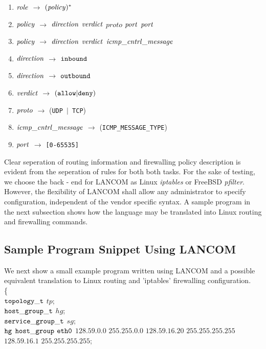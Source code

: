 \begin{enumerate}
\item \noindent ${\it role}$ $\rightarrow$ $({\it policy})^{*}$ \\
\item ${\it policy}$ $\rightarrow$ ${\it direction}$ ${\it verdict}$ ${proto}$ ${\it port}$ ${\it port}$ \\ 
\item ${\it policy}$ $\rightarrow$ ${\it direction}$ ${\it verdict}$ ${\it icmp\_cntrl\_message}$ \\ 
\item ${\it direction}$ $\rightarrow$ ${\tt inbound}$ \\ 
\item ${\it direction}$ $\rightarrow$ ${\tt outbound}$ \\ 
\item ${\it verdict}$ $\rightarrow$ $({\tt allow}|{\tt deny})$ \\ 
\item ${\it proto}$ $\rightarrow$ ({\tt UDP $ | $ TCP}) \\ 
\item ${\it icmp\_cntrl\_message}$ $\rightarrow$ ({\tt ICMP\_MESSAGE\_TYPE}) \\ 
\item ${\it port}$ $\rightarrow$ {\tt [0-65535]}\\
\end{enumerate}

  Clear seperation of routing information and firewalling policy description
  is evident from the seperation of rules for both both tasks.
   For the sake of testing, we choose the back - end for LANCOM as Linux
  {\it iptables} or FreeBSD {\it pfilter}. However, the flexibility of LANCOM 
   shall allow any administrator to specify configuration, independent of the 
   vendor specific syntax. A sample program in the next subsection shows how
  the language may be translated into Linux routing and firewalling commands.

 \subsection{Sample Program Snippet Using LANCOM}

  We next show a small example program written using LANCOM and a possible
  equivalent translation to Linux routing and 'iptables' firewalling
  configuration. \\

 \noindent \{\\
  \indent ${\tt topology\_t}$ $tp$;\\
  \indent ${\tt host\_group\_t}$ $hg$;\\
  \indent ${\tt service\_group\_t}$ $sg$;\\
  \indent ${\tt hg}$ ${\tt host\_group}$ ${\tt eth0}$ $128.59.0.0$ $255.255.0.0$ $128.59.16.20$ $255.255.255.255$
          $128.59.16.1$ $255.255.255.255$;\\

